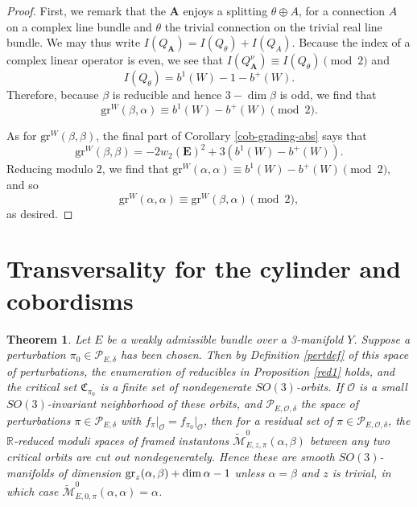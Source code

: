 \documentclass{memo-l}
\newtheorem{theorem}{Theorem}[chapter]
\theoremstyle{definition}
\theoremstyle{remark}
\numberwithin{section}{chapter}
\numberwithin{equation}{chapter}
\begin{document}
\begin{proof}
First, we remark that the $\mathbf{A}$ enjoys a splitting $\theta \oplus A$, for a connection $A$ on a complex line bundle and $\theta$ the trivial connection on the trivial real line bundle. We may thus write $I(Q_{\mathbf{A}}) = I(Q_{\theta}) + I(Q_{A})$. Because the index of a complex linear operator is even, we see that $I(Q^\nu_{\mathbf{A}}) \equiv I(Q_\theta) \pmod 2$ and $$I(Q_\theta) = b^1(W) - 1 - b^+(W).$$ Therefore, because $\beta$ is reducible and hence $3 - \dim \beta$ is odd, we find that $$\text{gr}^W(\beta, \alpha) \equiv b^1(W) - b^+(W) \pmod 2.$$

As for $\text{gr}^W(\beta, \beta)$, the final part of Corollary \ref{cob-grading-abs} says that $$\text{gr}^W(\beta, \beta) = -2w_2(\mathbf{E})^2 + 3(b^1(W)-b^+(W)).$$ Reducing modulo $2$, we find that $\text{gr}^W(\alpha, \alpha) \equiv b^1(W) - b^+(W) \pmod 2,$ and so $$\text{gr}^W(\alpha, \alpha) \equiv \text{gr}^W(\beta, \alpha) \pmod 2,$$ as desired. 
\end{proof}

\section{Transversality for the cylinder and cobordisms}\label{sec:4d-trans}
\begin{theorem}\label{trans2}Let $E$ be a weakly admissible bundle over a 3-manifold $Y$. Suppose a perturbation $\pi_0\in \mathcal P_{E,\delta}$ has been chosen. Then by Definition \ref{pertdef} of this space of perturbations, the enumeration of reducibles in Proposition \ref{red1} holds, and the critical set $\mathfrak C_{\pi_0}$ is a finite set of nondegenerate $SO(3)$-orbits. If $\mathcal O$ is a small $SO(3)$-invariant neighborhood of these orbits, and $\mathcal P_{E,\mathcal O, \delta}$ the space of perturbations $\pi \in \mathcal P_{E,\delta}$ with $f_\pi\big|_{\mathcal O}= f_{\pi_0} \big|_{\mathcal O}$, then for a residual set of $\pi \in \mathcal P_{E,\mathcal O,\delta}$, the $\mathbb R$-reduced moduli spaces of framed instantons $\widetilde{\mathcal M}^0_{E,z,\pi}(\alpha, \beta)$ between any two critical orbits are cut out nondegenerately. Hence these are smooth $SO(3)$-manifolds of dimension $\textup{gr}_z(\alpha, \beta) + \dim \alpha - 1$ unless $\alpha = \beta$ and $z$ is trivial, in which case $\widetilde{\mathcal M}^0_{E,0,\pi}(\alpha, \alpha) = \alpha$.
\end{theorem}
\end{document}
